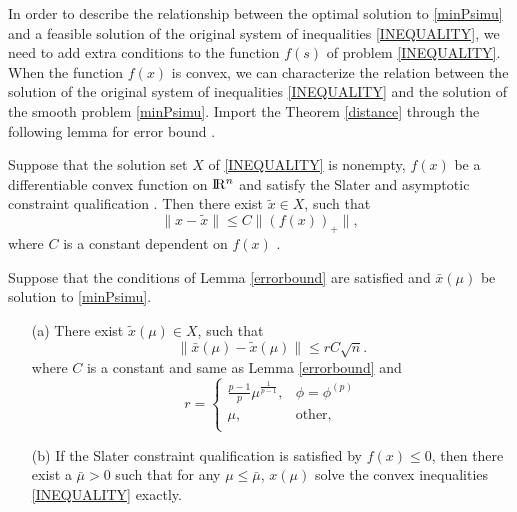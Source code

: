 \documentclass[12pt]{article}
\renewcommand{\Re}{{\rm I}\! {\rm R}}
\newcommand{\rn}{\Re^n}
\begin{document}
In order to describe the relationship between the optimal  solution 
to  \eqref{minPsimu} and a feasible solution of the original system of
inequalities \eqref{INEQUALITY}, we need to add extra conditions to 
the function $f(s)$ of problem \eqref{INEQUALITY}. 
When the function $f(x)$ is convex, we can characterize the relation 
between the solution of the original system of  inequalities \eqref{INEQUALITY} 
and the solution of the smooth problem \eqref{minPsimu}. Import the
Theorem \ref{distance} through the following lemma for error bound \cite{M1995,M1985}.

\begin{lemma}\label{errorbound}
Suppose that the solution set $X$ of  \eqref{INEQUALITY} is nonempty, 
$f(x)$ be a differentiable convex function on  $\rn$ and satisfy the 
Slater and asymptotic constraint qualification \cite{M1995}.
Then there exist $\tilde{x} \in X$, such that
    $$ \| x- \tilde{x}\| \leq C\|(f(x))_+\|,$$
where $C$ is a constant dependent on $f(x)$ \cite{M1995}.
\end{lemma}

\begin{theorem}\label{distance}
  Suppose that the conditions of Lemma \ref{errorbound} are satisfied 
and $\bar{x}(\mu)$ be solution to \eqref{minPsimu}.
\begin{enumerate}
    \item[(a)] There exist $\tilde{x}(\mu) \in X$, such that
                $$ \| \bar{x}(\mu) - \tilde{x}(\mu)\| \leq rC\sqrt{n}.$$
                where $C$ is a constant and same as Lemma \ref{errorbound} and
                \begin{equation*}
                 r=\left\{
                    \begin{array}{cc}
                        \frac{p-1}{p}\mu^{\frac{1}{p-1}}, & \phi= \phi^{(p)}\\
                        \mu, & \text{other},\\
                     \end{array}\right.
                \end{equation*}

    \item[(b)] If the  Slater constraint qualification  is satisfied 
                by $f({x}) \leq 0$, then there exist a $\bar\mu >0$ such that for 
                any $\mu \leq \bar\mu$, $x(\mu)$ solve the convex 
                inequalities \eqref{INEQUALITY} exactly.
\end{enumerate}
\end{theorem}
\end{document}
